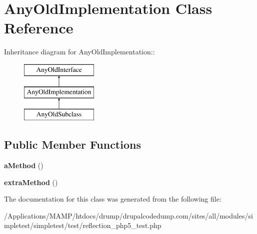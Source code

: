 \hypertarget{class_any_old_implementation}{
\section{AnyOldImplementation Class Reference}
\label{class_any_old_implementation}
}
Inheritance diagram for AnyOldImplementation::\begin{figure}[H]
\begin{center}
\leavevmode
\includegraphics[height=3cm]{class_any_old_implementation}
\end{center}
\end{figure}
\subsection*{Public Member Functions}
\begin{DoxyCompactItemize}
\item 
\hypertarget{class_any_old_implementation_ab47c921b79abb8c8ed8294ef1f5febfc}{
{\bfseries aMethod} ()}
\label{class_any_old_implementation_ab47c921b79abb8c8ed8294ef1f5febfc}

\item 
\hypertarget{class_any_old_implementation_aeda274eb87c90609479667bd341b46c8}{
{\bfseries extraMethod} ()}
\label{class_any_old_implementation_aeda274eb87c90609479667bd341b46c8}

\end{DoxyCompactItemize}


The documentation for this class was generated from the following file:\begin{DoxyCompactItemize}
\item 
/Applications/MAMP/htdocs/drump/drupalcodedump.com/sites/all/modules/simpletest/simpletest/test/reflection\_\-php5\_\-test.php\end{DoxyCompactItemize}

